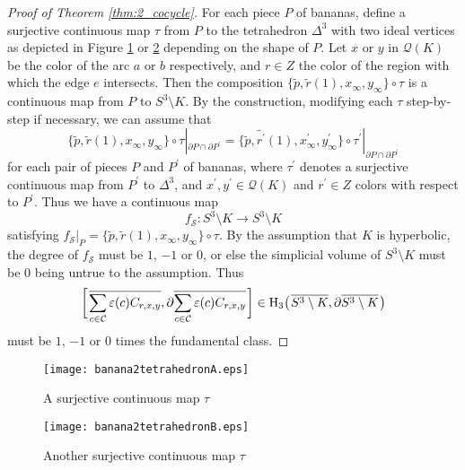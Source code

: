 \documentclass[12pt]{amsart}
\theoremstyle{definition}
\begin{document}
\begin{proof}[Proof of Theorem \ref{thm:2_cocycle}]
For each piece $P$ of bananas, define a surjective continuous map $\tau$ from $P$ to the tetrahedron $\Delta^{3}$ with two ideal vertices as depicted in Figure \ref{fig:banana2tetrahedronA} or \ref{fig:banana2tetrahedronB} depending on the shape of $P$.
Let $x$ or $y$ in $\mathcal{Q}(K)$ be the color of the arc $a$ or $b$ respectively, and $r \in Z$ the color of the region with which the edge $e$ intersects.
Then the composition $\{ \widetilde{p}, \widetilde{r}(1), x_{\infty}, y_{\infty} \} \circ \tau$ is a continuous map from $P$ to $S^{3} \setminus K$.
By the construction, modifying each $\tau$ step-by-step if necessary, we can assume that
\[
 \{ \widetilde{p}, \widetilde{r}(1), x_{\infty}, y_{\infty} \} \circ \tau|_{\partial P \cap \partial P^{\prime}} = \{ \widetilde{p}, \widetilde{r^{\prime}}(1), x^{\prime}_{\infty}, y^{\prime}_{\infty} \} \circ \tau^{\prime}|_{\partial P \cap \partial P^{\prime}}
\]
for each pair of pieces $P$ and $P^{\prime}$ of bananas, where $\tau^{\prime}$ denotes a surjective continuous map from $P^{\prime}$ to $\Delta^{3}$, and $x^{\prime}, y^{\prime} \in \mathcal{Q}(K)$ and $r^{\prime} \in Z$ colors with respect to $P^{\prime}$.
Thus we have a continuous map
\[
 f_{\mathcal{S}} : S^{3} \setminus K \longrightarrow S^{3} \setminus K
\]
satisfying $f_{\mathcal{S}}|_{P} = \{ \widetilde{p}, \widetilde{r}(1), x_{\infty}, y_{\infty} \} \circ \tau$.
By the assumption that $K$ is hyperbolic, the degree of $f_{\mathcal{S}}$ must be $1$, $-1$ or $0$, or else the simplicial volume of $S^{3} \setminus K$ must be $0$ being untrue to the assumption.
Thus
\[
 \biggl[ \hskip 0.1em \overline{\sum_{c \in \mathcal{C}} \varepsilon(c) C_{r, x, y}}, \partial \overline{\sum_{c \in \mathcal{C}} \varepsilon(c) C_{r, x, y}} \hskip 0.1em \biggr] \in \mathrm{H}_{3} \bigl( \hskip 0.1em \overline{S^{3} \setminus K}, \partial \overline{S^{3} \setminus K} \hskip 0.1em \bigr)
\]
must be $1$, $-1$ or $0$ times the fundamental class.
\end{proof}

\begin{figure}[htb]
\begin{center}
\texttt{[image: banana2tetrahedronA.eps]}
\end{center}
\caption{A surjective continuous map $\tau$}
\label{fig:banana2tetrahedronA}
\end{figure}

\begin{figure}[htb]
\begin{center}
\texttt{[image: banana2tetrahedronB.eps]}
\end{center}
\caption{Another surjective continuous map $\tau$}
\label{fig:banana2tetrahedronB}
\end{figure}
\end{document}
